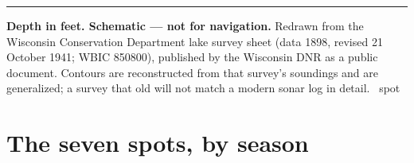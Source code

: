\vspace{0.2em}
\begin{center}
\scalebox{1.08}{}

\vspace{0.25em}
\begin{minipage}{0.94\linewidth}
\rule{\linewidth}{0.35pt}\par
\vspace{0.15em}
{\fontsize{7}{8.4}\selectfont
\textbf{Depth in feet. Schematic --- not for navigation.} Redrawn from the
Wisconsin Conservation Department lake survey sheet (data 1898, revised 21
October 1941; WBIC 850800), published by the Wisconsin DNR as a public document.
Contours are reconstructed from that survey's soundings and are generalized;
a survey that old will not match a modern sonar log in detail.
\quad
{}\quad
{}\quad
{}\quad
{}\quad
{}\quad
{}\quad
{}\quad
{}~spot
\par}
\end{minipage}
\end{center}

\newpage

\section{The seven spots, by season}

